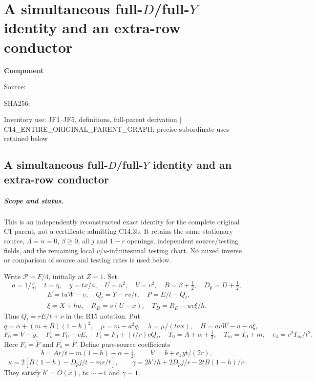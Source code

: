\chapter{A simultaneous full-$D$/full-$Y$ identity and an extra-row conductor}
\label{component:pa73a17051258}
\noindent\textbf{Component }\par
{\small\noindent Source: \par}
{\small\noindent SHA256: \par}
{\small\noindent Inventory use: JF1--JF5, definitions, full-parent derivation | C14\_\allowbreak{}ENTIRE\_\allowbreak{}ORIGINAL\_\allowbreak{}PARENT\_\allowbreak{}GRAPH; precise subordinate uses retained below\par}
\medskip
\section{A simultaneous full-$D$/full-$Y$ identity and an extra-row conductor}
\paragraph{Scope and status.}
This is an independently reconstructed exact identity for the complete
original C1 parent, not a certificate admitting C14.3b. It retains the
same stationary source, $\Lambda=n=0$, $\beta\ge0$, all $j$ and $1-r$
openings, independent source/testing fields, and the remaining local
$v/u$-infinitesimal testing chart. No mixed inverse or comparison of
source and testing rates is used below.

Write $\mathcal P=F/4$, initially at $Z=1$. Set
\[
 a=1/\zeta,\quad t=\eta,\quad y=tx/a,\quad U=u^2,\quad V=v^2,
 \quad B=\beta+\tfrac12,\quad D_p=D+\tfrac12,
\]
\[
 \begin{gathered}
 E=tuW-v,\quad Q_t=Y-rv/t,\quad P=E/t-Q_t,\\
 \xi=X+hu,\quad R_D=v(U-x),\quad T_D=R_D-uv\xi/h.
 \end{gathered}
\]
Thus $Q_t=rE/t+\nu$ in the R15 notation. Put
\[
 q=\alpha+(m+B)(1-h)^2,\quad\mu=m-a^2q,
 \quad\lambda=\mu/(tax),\quad H=avW-u-a\xi,
\]
\[
 F_0=V-y,\quad F_b=F_0+vE,\quad F_t=F_0+(t/r)vQ_t,
 \quad T_0=A+\alpha+\tfrac12,\quad T_m=T_0+m,
 \quad e_4=r^2T_m/t^2.
\]
Here $F_t=\widetilde F$ and $F_b=\overline F$. Define pure-source
coefficients
\[
 b=Ar/t-m(1-h)-\alpha-\tfrac12,\qquad
 b'=b+e_4yt/(2r),
\]
\[
 \kappa=2[B(1-h)-D_pj/t-mr/t],\qquad
 \gamma=2b'/h+2D_pj/r-2tB(1-h)/r.
\]
They satisfy $b'=O(x)$, $t\kappa\sim-1$ and $\gamma\sim1$.


